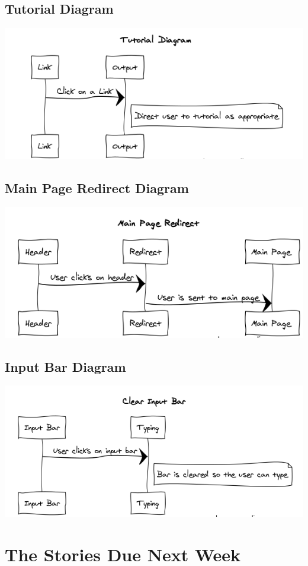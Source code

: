\documentclass[12pt]{article}
\begin{document}
\subsection{Tutorial Diagram}
\includegraphics[width = \textwidth]{tut.PNG}

\subsection{Main Page Redirect Diagram}
\includegraphics[width = \textwidth]{mainpagedia.PNG}

\subsection{Input Bar Diagram}
\includegraphics[width = \textwidth]{inputdia.PNG}

\section{The Stories Due Next Week}
\end{document}
